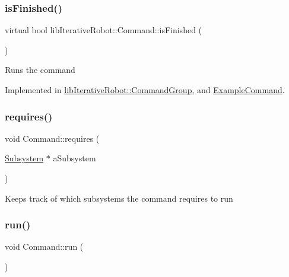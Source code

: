 \subsubsection{\texorpdfstring{isFinished()}{isFinished()}}
{\footnotesize\ttfamily virtual bool lib\+Iterative\+Robot\+::\+Command\+::is\+Finished (\begin{DoxyParamCaption}{ }\end{DoxyParamCaption})\hspace{0.3cm}{\ttfamily [pure virtual]}}

Runs the command 

Implemented in \mbox{\hyperlink{classlib_iterative_robot_1_1_command_group_a96807a2763adf9e21ebf2cb9e3574e3c}{lib\+Iterative\+Robot\+::\+Command\+Group}}, and \mbox{\hyperlink{class_example_command_ab4e52d526bda7fe22705b2d3c44286e0}{Example\+Command}}.

\mbox{\label{classlib_iterative_robot_1_1_command_ad7b7f328974f5f17a2a4b1593b6c9eb5}} 
\subsubsection{\texorpdfstring{requires()}{requires()}}
{\footnotesize\ttfamily void Command\+::requires (\begin{DoxyParamCaption}\item[{\mbox{\hyperlink{classlib_iterative_robot_1_1_subsystem}{Subsystem}} $\ast$}]{a\+Subsystem }\end{DoxyParamCaption})\hspace{0.3cm}{\ttfamily [protected]}}

Keeps track of which subsystems the command requires to run \mbox{\label{classlib_iterative_robot_1_1_command_a3f3790d1b8033d7253a9f44481032ee9}} 
\subsubsection{\texorpdfstring{run()}{run()}}
{\footnotesize\ttfamily void Command\+::run (\begin{DoxyParamCaption}{ }\end{DoxyParamCaption})}

